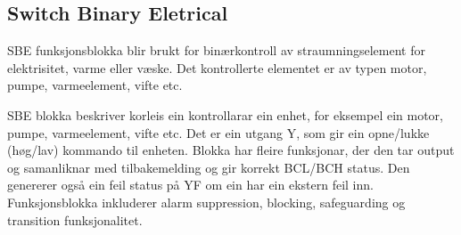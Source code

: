 \newpage

\subsection{Switch Binary Eletrical}

\gls{SBE} funksjonsblokka blir brukt for binærkontroll av straumningselement for elektrisitet, varme eller væske. Det
kontrollerte elementet er av typen motor, pumpe, varmeelement, vifte etc.

SBE blokka beskriver korleis ein kontrollarar ein enhet, for eksempel ein motor, pumpe, varmeelement, vifte etc.
Det er ein utgang Y, som gir ein opne/lukke (høg/lav) kommando til enheten. Blokka har fleire funksjonar, der den
tar output og samanliknar med tilbakemelding og gir korrekt BCL/BCH status. Den genererer også ein feil status på
YF om ein har ein ekstern feil inn.
Funksjonsblokka inkluderer alarm suppression, blocking, safeguarding og transition funksjonalitet.

